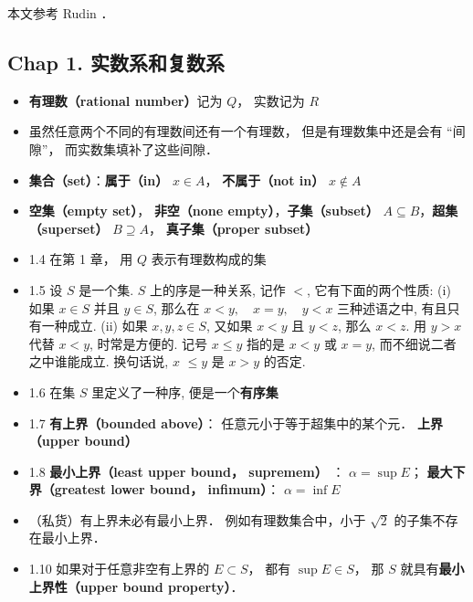 

本文参考 Rudin \cite{Rudin}．

\subsection{Chap 1. 实数系和复数系}

\begin{itemize}
\item \textbf{有理数（rational number）}记为 $Q$， 实数记为 $R$

\item 虽然任意两个不同的有理数间还有一个有理数， 但是有理数集中还是会有 “间隙”， 而实数集填补了这些间隙．

\item \textbf{集合（set）}：\textbf{属于（in）} $x \in A$， \textbf{不属于（not in）} $x \notin A$

\item \textbf{空集（empty set）}， \textbf{非空（none empty）}，\textbf{子集（subset）} $A \subseteq B$，\textbf{超集（superset）} $B \supseteq A$， \textbf{真子集（proper subset）}

\item 1.4 在第 1 章， 用 $Q$ 表示有理数构成的集

\item 1.5 设 $S$ 是一个集. $S$ 上的序是一种关系, 记作 $<$, 它有下面的两个性质: (i) 如果 $x \in S$ 并且 $y \in S$, 那么在 $x<y, \quad x=y, \quad y<x$ 三种述语之中, 有且只有一种成立. (ii) 如果 $x, y, z \in S$, 又如果 $x<y$ 且 $y<z$, 那么 $x<z$. 用 $y>x$ 代替 $x<y$, 时常是方便的. 记号 $x \leqslant y$ 指的是 $x<y$ 或 $x=y$, 而不细说二者之中谁能成立. 换句话说, $x$ $\leqslant y$ 是 $x>y$ 的否定.

\item 1.6 在集 $S$ 里定义了一种序, 便是一个\textbf{有序集}

\item 1.7 \textbf{有上界（bounded above）}： 任意元小于等于超集中的某个元． \textbf{上界（upper bound）}

\item 1.8 \textbf{最小上界（least upper bound， supremem）} ： $\alpha = \sup E$； \textbf{最大下界（greatest lower bound， infimum）}： $\alpha = \inf E$

\item （私货）有上界未必有最小上界． 例如有理数集合中，小于 $\sqrt{2}$ 的子集不存在最小上界．

\item 1.10 如果对于任意非空有上界的 $E \subset S$， 都有 $\sup E \in S$， 那 $S$ 就具有\textbf{最小上界性（upper bound property）}．


\end{itemize}

